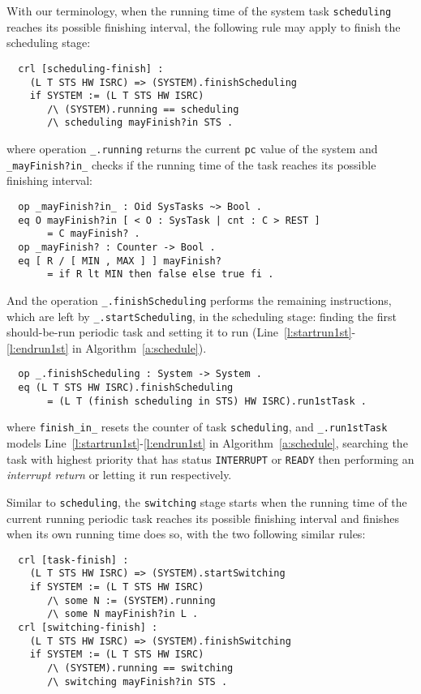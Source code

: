 \documentclass{llncs}
\begin{document}
With our terminology, when the running time of the system task
\verb|scheduling| reaches its possible finishing interval, the
following rule may apply to finish the scheduling stage:
\begin{verbatim}
  crl [scheduling-finish] :
    (L T STS HW ISRC) => (SYSTEM).finishScheduling
    if SYSTEM := (L T STS HW ISRC) 
       /\ (SYSTEM).running == scheduling 
       /\ scheduling mayFinish?in STS .
\end{verbatim}
where operation \verb|_.running| returns the current \verb|pc| value
of the system and \verb|_mayFinish?in_| checks if the running time of
the task reaches its possible finishing interval:
\begin{verbatim}
  op _mayFinish?in_ : Oid SysTasks ~> Bool .
  eq O mayFinish?in [ < O : SysTask | cnt : C > REST ] 
       = C mayFinish? .
  op _mayFinish? : Counter -> Bool .
  eq [ R / [ MIN , MAX ] ] mayFinish?
       = if R lt MIN then false else true fi .
\end{verbatim}
And the operation \verb|_.finishScheduling| performs the remaining
instructions, which are left by \verb|_.startScheduling|, in the
scheduling stage: finding the first should-be-run periodic task and
setting it to run (Line~\ref{l:startrun1st}-\ref{l:endrun1st} in
Algorithm~\ref{a:schedule}).
\begin{verbatim}
  op _.finishScheduling : System -> System .
  eq (L T STS HW ISRC).finishScheduling
       = (L T (finish scheduling in STS) HW ISRC).run1stTask .
\end{verbatim}
where \verb|finish_in_| resets the counter of task \verb|scheduling|,
and \verb|_.run1stTask| models
Line~\ref{l:startrun1st}-\ref{l:endrun1st} in
Algorithm~\ref{a:schedule}, searching the task with highest priority
that has status \verb|INTERRUPT| or \verb|READY| then performing an
\emph{interrupt return} or letting it run respectively.

Similar to \verb|scheduling|, the \verb|switching| stage starts when
the running time of the current running periodic task reaches its
possible finishing interval and finishes when its own running time
does so, with the two following similar rules:
\begin{verbatim}
  crl [task-finish] :
    (L T STS HW ISRC) => (SYSTEM).startSwitching
    if SYSTEM := (L T STS HW ISRC)
       /\ some N := (SYSTEM).running
       /\ some N mayFinish?in L .
  crl [switching-finish] :
    (L T STS HW ISRC) => (SYSTEM).finishSwitching
    if SYSTEM := (L T STS HW ISRC)
       /\ (SYSTEM).running == switching
       /\ switching mayFinish?in STS .
\end{verbatim}
\end{document}
